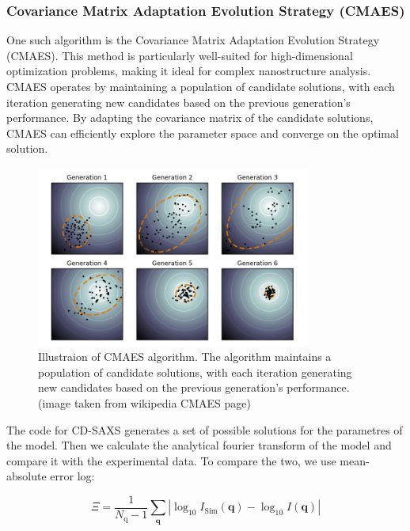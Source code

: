 \subsubsection{Covariance Matrix Adaptation Evolution Strategy (CMAES)}

One such algorithm is the Covariance Matrix Adaptation Evolution Strategy (CMAES). This method is particularly well-suited for high-dimensional optimization problems, making it ideal for complex nanostructure analysis. CMAES operates by maintaining a population of candidate solutions, with each iteration generating new candidates based on the previous generation's performance. By adapting the covariance matrix of the candidate solutions, CMAES can efficiently explore the parameter space and converge on the optimal solution.

\begin{figure}[h]
    \centering
    \includegraphics[width=0.8\textwidth]{images/CMAES.png}
    \caption{Illustraion of CMAES algorithm. The algorithm maintains a population of candidate solutions, with each iteration generating new candidates based on the previous generation's performance.(image taken from wikipedia CMAES page) }
    \label{fig:cmaes}
\end{figure}

\FloatBarrier

\medskip

The code for CD-SAXS generates a set of possible solutions for the parametres of the model. Then we calculate the 
analytical fourier transform of the model and compare it with the experimental data. To compare the two,
we use mean-absolute error log:

\medskip

\begin{equation}
    \Xi=\frac{1}{N_{\mathrm{q}}-1} \sum_{\mathbf{q}}\left|\log _{10} I_{\mathrm{Sim}}(\mathbf{q})-\log _{10} I(\mathbf{q})\right|
\end{equation}

